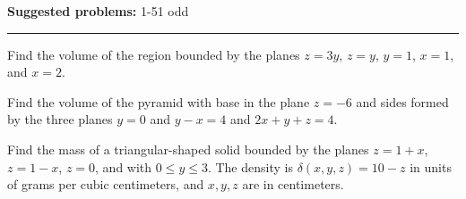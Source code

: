 \documentclass[12pt,reqno]{amsart}
\begin{document}
\textbf{Suggested problems:} 1-51 odd

\bigskip
\hrule

\bigskip
\prob Find the volume of the region bounded by the planes $z=3y$, $z=y$, $y=1$, $x=1$, and $x=2$.

\vfill
\prob Find the volume of the pyramid with base in the plane $z=-6$ and sides formed by the three planes $y=0$ and $y-x=4$ and $2x+y+z=4$.

\vfill
\newpage
\prob Find the mass of a triangular-shaped solid bounded by the planes $z=1+x$, $z=1-x$, $z=0$, and with $0 \leq y \leq 3$. The density is $\delta(x,y,z)=10-z$ in units of grams per cubic centimeters, and $x,y,z$ are in centimeters.
\end{document}

